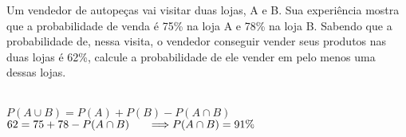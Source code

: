 \begin{ex}
 Um vendedor de autopeças vai visitar duas lojas, A e B. Sua experiência mostra que a probabilidade de venda é 75\% na loja A e 78\% na loja B. Sabendo que a probabilidade de, nessa visita, o vendedor conseguir vender seus produtos nas duas lojas é 62\%, calcule a probabilidade de ele vender em pelo menos uma dessas lojas.
  \begin{sol}
   \phantom{A}\\
   $P(A\cup B)=P(A)+P(B)-P(A\cap B) $ \\
   $62=75+78-P(A\cap B) \hspace{0,6cm} \Longrightarrow P(A \cap B) = 91\%$
  \end{sol}
\end{ex}